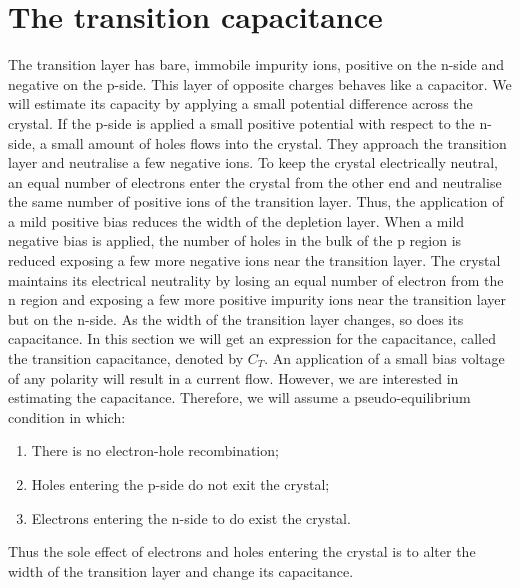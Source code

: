 \section{The transition capacitance}\label{c2s3}
The transition layer has bare, immobile impurity ions, positive on the n-side 
and negative on the p-side. This layer of opposite charges behaves like a
capacitor. We will estimate its capacity by applying a small potential 
difference across the crystal. If the p-side is applied a small positive
potential with respect to the n-side, a small amount of holes flows into the
crystal. They approach the transition layer and neutralise a few negative ions.
To keep the crystal electrically neutral, an equal number of electrons enter
the crystal from the other end and neutralise the same number of positive ions
of the transition layer. Thus, the application of a mild positive bias reduces
the width of the depletion layer. When a mild negative bias is applied, the
number of holes in the bulk of the p region is reduced exposing a few more
negative ions near the transition layer. The crystal maintains its electrical 
neutrality by losing an equal number of electron from the n region and exposing
a few more positive impurity ions near the transition layer but on the n-side.
As the width of the transition layer changes, so does its capacitance. In this
section we will get an expression for the capacitance, called the transition
capacitance, denoted by $C_T$. An application of a small bias voltage of any
polarity will result in a current flow. However, we are interested in estimating
the capacitance. Therefore, we will assume a pseudo-equilibrium condition in
which:
\begin{enumerate}
\item There is no electron-hole recombination;
\item Holes entering the p-side do not exit the crystal;
\item Electrons entering the n-side to do exist the crystal.
\end{enumerate}
Thus the sole effect of electrons and holes entering the crystal is to alter
the width of the transition layer and change its capacitance.

